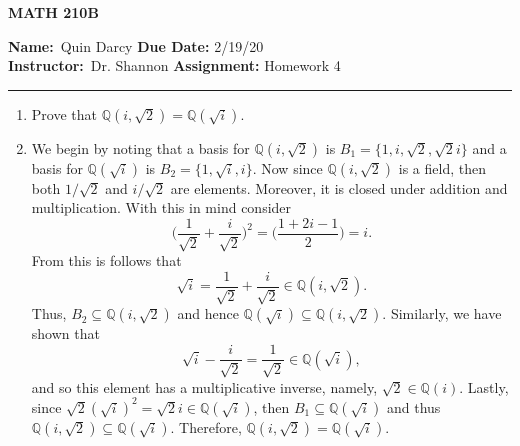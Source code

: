\documentclass[12pt]{article}
\makeatletter
\theoremstyle{definition}
\theoremstyle{remark}
\renewenvironment{proof}[1][\proofname]{\par
  \pushQED{\qed}%
  \normalfont \topsep6\p@\@plus6\p@\relax
  \list{}{\leftmargin=0mm
          \rightmargin=4mm
          \settowidth{\itemindent}{\itshape#1}%
          \labelwidth=\itemindent
          \parsep=0pt \listparindent=\parindent 
  }
  \item[\hskip\labelsep
        \itshape
    #1\@addpunct{.}]\ignorespaces
}{%
  \popQED\endlist\@endpefalse
}
\let\oldproofname=\proofname
\renewcommand{\proofname}{\bf{\textit{\oldproofname}}}
\makeatother
\begin{document}
\thispagestyle{empty}\hline

\begin{center}
	\vspace{.4cm} {\textbf { \large MATH 210B}}
\end{center}
{\textbf{Name:}\ Quin Darcy \hspace{\fill} \textbf{Due Date:} 2/19/20   \\
{ \textbf{Instructor:}}\ Dr. Shannon \hspace{\fill} \textbf{Assignment:} Homework 4 \\ \hrule}

\justifying

    \begin{enumerate}[leftmargin=*]
        \item Prove that $\mathbb{Q}(i,\sqrt{2})=\mathbb{Q}(\sqrt{i})$.
            \begin{proof}
                We begin by noting that a basis for $\mathbb{Q}(i,\sqrt{2})$ is $B_1=\{1,i,\sqrt{2},\sqrt{2}i\}$ and a basis for $\mathbb{Q}(\sqrt{i})$ is $B_2=\{1,\sqrt{i},i\}$. Now since $\mathbb{Q}(i,\sqrt{2})$ is a field, then both $1/\sqrt{2}$ and $i/\sqrt{2}$ are elements. Moreover, it is closed under addition and multiplication. With this in mind consider
                    \begin{equation*}
                        \bigg(\frac{1}{\sqrt{2}}+\frac{i}{\sqrt{2}}\bigg)^2=\bigg(\frac{1+2i-1}{2}\bigg)=i.
                    \end{equation*}
                From this is follows that 
                    \begin{equation*}
                        \sqrt{i}=\frac{1}{\sqrt{2}}+\frac{i}{\sqrt{2}}\in\mathbb{Q}(i,\sqrt{2}).
                    \end{equation*}
                Thus, $B_2\subseteq\mathbb{Q}(i,\sqrt{2})$ and hence $\mathbb{Q}(\sqrt{i})\subseteq\mathbb{Q}(i,\sqrt{2})$. Similarly, we have shown that
                    \begin{equation*}
                        \sqrt{i}-\frac{i}{\sqrt{2}}=\frac{1}{\sqrt{2}}\in\mathbb{Q}(\sqrt{i}),
                    \end{equation*}
                and so this element has a multiplicative inverse, namely, $\sqrt{2}\in\mathbb{Q}(i)$. Lastly, since $\sqrt{2}(\sqrt{i})^2=\sqrt{2}i\in\mathbb{Q}(\sqrt{i})$, then $B_1\subseteq\mathbb{Q}(\sqrt{i})$ and thus $\mathbb{Q}(i,\sqrt{2})\subseteq\mathbb{Q}(\sqrt{i})$. Therefore, $\mathbb{Q}(i,\sqrt{2})=\mathbb{Q}(\sqrt{i})$.
            \end{proof}

\end{enumerate}
\end{document}

